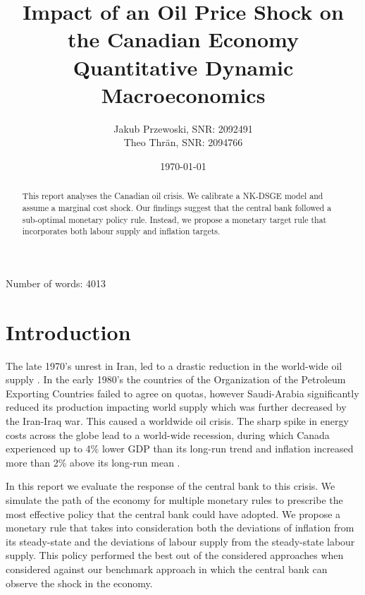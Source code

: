 \documentclass[12pt]{article}
\title{\textbf{Impact of an Oil Price Shock on the Canadian Economy} \\ \large{Quantitative Dynamic Macroeconomics}}
\author{Jakub Przewoski, SNR: 2092491\\ Theo Thrän, SNR: 2094766}
\date{\today}
\begin{document}
\maketitle
{}

\begin{center}
    \large
    Number of words: 4013
    
    \vfill{}
    \begin{abstract}
        This report analyses the Canadian oil crisis. We calibrate a NK-DSGE model and assume a marginal cost shock. Our findings suggest that the central bank followed a sub-optimal monetary policy rule. Instead, we propose a monetary target rule that incorporates both labour supply and inflation targets. 
    \end{abstract}
\end{center}

\newpage

\tableofcontents{}

\newpage

\section{Introduction}
The late 1970's unrest in Iran, led to a drastic reduction in the world-wide oil supply \parencite{OilSqueeze1979}. In the early 1980's the countries of the Organization of the Petroleum Exporting Countries failed to agree on quotas, however Saudi-Arabia significantly reduced its production impacting world supply \parencite{tagliabueOPECFAILSSET1982} which was further decreased by the Iran-Iraq war. This caused a worldwide oil crisis. The sharp spike in energy costs across the globe lead to a world-wide recession, during which Canada experienced up to 4\% lower GDP than its long-run trend and inflation increased more than 2\% above its long-run mean 
\parencite{koseGlobalRecessions2020,worldbank_inflation_ca,fred_gdp_per_capita_ca}.

In this report we evaluate the response of the central bank to this crisis. We simulate the path of the economy for multiple monetary rules to prescribe the most effective policy that the central bank could have adopted. We propose a monetary rule that takes into consideration both the deviations of inflation from its steady-state and the deviations of labour supply from the steady-state labour supply. This policy performed the best out of the considered approaches when considered against our benchmark approach in which the central bank can observe the shock in the economy.
\end{document}
